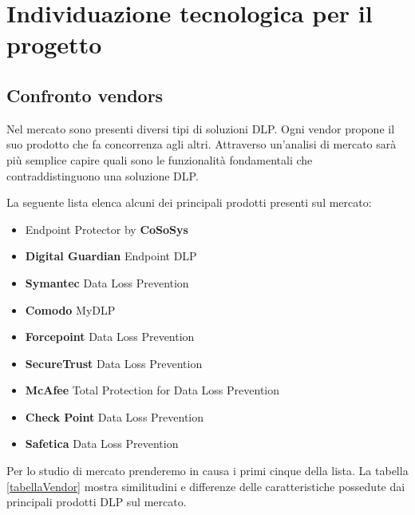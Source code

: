 \chapter{Individuazione tecnologica per il progetto}

\section{Confronto vendors}
Nel mercato sono presenti diversi tipi di soluzioni DLP. Ogni vendor propone il suo prodotto che fa 
concorrenza agli altri. Attraverso un'analisi di mercato sarà più semplice capire quali sono le funzionalità
fondamentali che contraddistinguono una soluzione DLP.

La seguente lista elenca alcuni dei principali prodotti presenti sul mercato:

\begin{itemize}
    \item Endpoint Protector by \textbf{CoSoSys}
    \item \textbf{Digital Guardian} Endpoint DLP
    \item \textbf{Symantec} Data Loss Prevention
    \item \textbf{Comodo} MyDLP
    \item \textbf{Forcepoint} Data Loss Prevention
    \item \textbf{SecureTrust} Data Loss Prevention
    \item \textbf{McAfee} Total Protection for Data Loss Prevention
    \item \textbf{Check Point} Data Loss Prevention
    \item \textbf{Safetica} Data Loss Prevention
  \end{itemize}

  Per lo studio di mercato prenderemo in causa i primi cinque della lista. 
  La tabella \ref{tabellaVendor} mostra similitudini e differenze delle caratteristiche possedute dai 
  principali prodotti DLP sul mercato.

